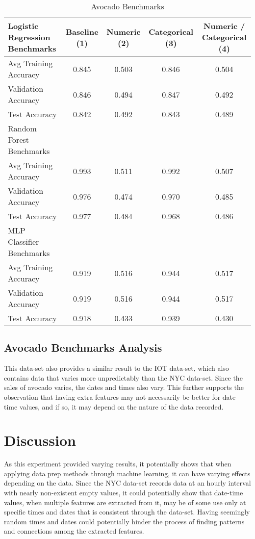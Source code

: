 \documentclass{article}
\begin{document}
\def\arraystretch{1}
\begin{table}[ht]
\caption{Avocado Benchmarks}
\centering
    \begin{tabular}{lcccc}
    \toprule
    Logistic Regression Benchmarks & Baseline (1) & Numeric (2) & Categorical (3) & Numeric / Categorical (4) \\
    \midrule
    Avg Training Accuracy & 0.845 &	0.503 &	0.846 &	0.504 \\
    Validation Accuracy & 0.846	& 0.494	& 0.847	& 0.492 \\
    Test Accuracy & 0.842 &	0.492 &	0.843 &	0.489 \\
    \midrule
    Random Forest Benchmarks & & & & \\
    \midrule
    Avg Training Accuracy & 0.993 &	0.511 &	0.992 &	0.507 \\
    Validation Accuracy & 0.976	& 0.474	& 0.970	& 0.485 \\
    Test Accuracy & 0.977 &	0.484 &	0.968 &	0.486 \\
    \midrule
    MLP Classifier Benchmarks & & & & \\
    \midrule
    Avg Training Accuracy & 0.919 &	0.516 &	0.944 &	0.517 \\
    Validation Accuracy & 0.919	& 0.516	& 0.944	& 0.517 \\
    Test Accuracy & 0.918 &	0.433 &	0.939 &	0.430 \\
    \bottomrule
    \end{tabular}
\end{table}

\subsection{Avocado Benchmarks Analysis}
This data-set also provides a similar result to the IOT data-set, which also contains data that varies more unpredictably than the NYC data-set. Since the sales of avocado varies, the dates and times also vary. This further supports the observation that having extra features may not necessarily be better for date-time values, and if so, it may depend on the nature of the data recorded.

\section{Discussion}
As this experiment provided varying results, it potentially shows that when applying data prep methods through machine learning, it can have varying effects depending on the data. Since the NYC data-set records data at an  hourly interval with nearly non-existent empty values, it could potentially show that date-time values, when multiple features are extracted from it, may be of some use only at specific times and dates that is consistent through the data-set. Having seemingly random times and dates could potentially hinder the process of finding patterns and connections among the extracted features. 

\printbibliography
\end{document}
